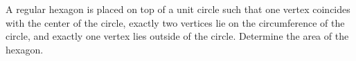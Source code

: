 
A regular hexagon is placed on top of a unit circle such that one vertex coincides with the center of the circle, exactly two vertices lie on the circumference of the circle, and exactly one vertex lies outside of the circle. Determine the area of the hexagon.